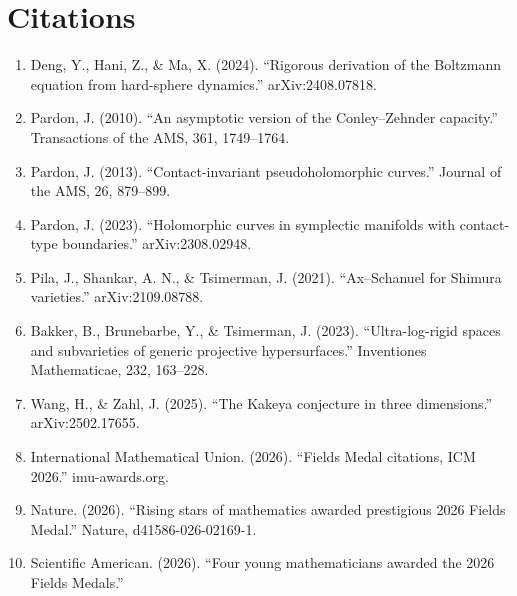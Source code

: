 \section{Citations}

\begin{enumerate}
\item Deng, Y., Hani, Z., \& Ma, X. (2024). ``Rigorous derivation of the Boltzmann equation from hard-sphere dynamics.'' arXiv:2408.07818.
\item Pardon, J. (2010). ``An asymptotic version of the Conley--Zehnder capacity.'' Transactions of the AMS, 361, 1749--1764.
\item Pardon, J. (2013). ``Contact-invariant pseudoholomorphic curves.'' Journal of the AMS, 26, 879--899.
\item Pardon, J. (2023). ``Holomorphic curves in symplectic manifolds with contact-type boundaries.'' arXiv:2308.02948.
\item Pila, J., Shankar, A. N., \& Tsimerman, J. (2021). ``Ax--Schanuel for Shimura varieties.'' arXiv:2109.08788.
\item Bakker, B., Brunebarbe, Y., \& Tsimerman, J. (2023). ``Ultra-log-rigid spaces and subvarieties of generic projective hypersurfaces.'' Inventiones Mathematicae, 232, 163--228.
\item Wang, H., \& Zahl, J. (2025). ``The Kakeya conjecture in three dimensions.'' arXiv:2502.17655.
\item International Mathematical Union. (2026). ``Fields Medal citations, ICM 2026.'' imu-awards.org.
\item Nature. (2026). ``Rising stars of mathematics awarded prestigious 2026 Fields Medal.'' Nature, d41586-026-02169-1.
\item Scientific American. (2026). ``Four young mathematicians awarded the 2026 Fields Medals.''
\end{enumerate}

